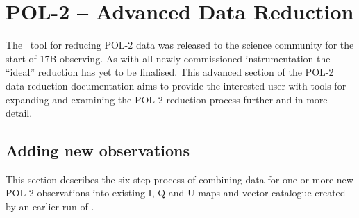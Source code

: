 \chapter{POL-2 -- Advanced Data Reduction}
\label{sec:advanced}


The \poltwomap\ tool for reducing POL-2 data was released to the science
community for the start of 17B observing. As with all newly
commissioned instrumentation the ``ideal'' reduction has yet to be
finalised. This advanced section of the POL-2 data reduction
documentation aims to provide the interested user with tools for
expanding and examining the POL-2 reduction process further and in
more detail.


\section{Adding new observations}

This section describes the six-step process of combining data for one
or more new POL-2 observations into existing I, Q and U maps and vector
catalogue created by an earlier run of .

